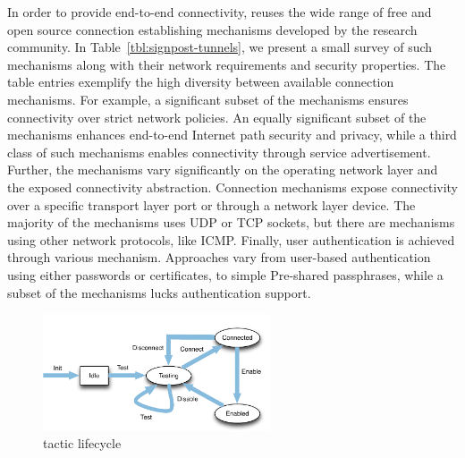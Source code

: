 In order to provide end-to-end connectivity, \signpost reuses the wide range of
free and open source connection establishing mechanisms developed by the
research community. In Table~\ref{tbl:signpost-tunnels}, we present a small
survey of such mechanisms along with their network requirements and security
properties.  The table entries exemplify the high diversity between available
connection mechanisms.  For example, a significant subset of the mechanisms
ensures connectivity over strict network policies. An equally significant subset
of the mechanisms enhances end-to-end Internet path security and privacy, while
a third class of such mechanisms enables connectivity through service
advertisement.  Further, the mechanisms vary significantly on the operating
network layer and the exposed connectivity abstraction. Connection mechanisms
expose connectivity over a specific transport layer port or through a network
layer device.  The majority of the mechanisms uses UDP or TCP sockets, but there
are mechanisms using other network protocols, like ICMP.  Finally, user
authentication is achieved through various mechanism.  Approaches vary from
user-based authentication using either passwords or certificates, to simple
Pre-shared passphrases, while a subset of the mechanisms lucks authentication
support. 

\begin{figure}
  \begin{center}
	\includegraphics[width=0.6\textwidth]{signpost-tactic}
  \end{center}
  \caption{\signpost tactic lifecycle}
  \label{fig:signpost-tactic}
\end{figure}

